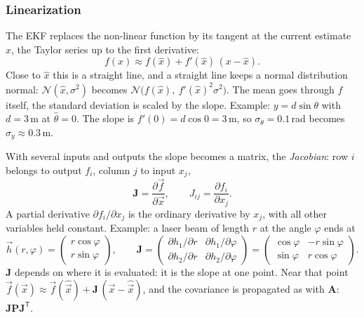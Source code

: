 \documentclass[11pt,a4paper,parskip=half]{scrartcl}
\newcommand{\mat}[1]{\mathbf{#1}}
\newcommand{\T}{^{\mathsf{T}}}
\begin{document}
\subsubsection*{Linearization}
The EKF replaces the non-linear function by its tangent at the current estimate \(\hat x\), the Taylor series up to
the first derivative:
\begin{equation}
  f(x) \approx f(\hat x) + f'(\hat x)\,(x - \hat x) .
  \label{eq:taylor}
\end{equation}
Close to \(\hat x\) this is a straight line, and a straight line keeps a normal distribution normal:
\(\mathcal N(\hat x, \sigma^2)\) becomes \(\mathcal N\big(f(\hat x),\ f'(\hat x)^2 \sigma^2\big)\). The mean goes
through \(f\) itself, the standard deviation is scaled by the slope. Example: \(y = d \sin\theta\) with \(d = 3\)\,m at
\(\hat\theta = 0\). The slope is \(f'(0) = d\cos 0 = 3\)\,m, so \(\sigma_\theta = 0.1\)\,rad becomes
\(\sigma_y \approx 0.3\)\,m.

With several inputs and outputs the slope becomes a matrix, the \emph{Jacobian}: row \(i\) belongs to output
\(f_i\), column \(j\) to input \(x_j\),
\begin{equation}
  \mat J = \frac{\partial \vec f}{\partial \vec x} , \qquad J_{ij} = \frac{\partial f_i}{\partial x_j} .
  \label{eq:jacobian}
\end{equation}
A partial derivative \(\partial f_i / \partial x_j\) is the ordinary derivative by \(x_j\), with all other variables
held constant. Example: a laser beam of length \(r\) at the angle \(\varphi\) ends at
\begin{equation*}
  \vec h(r, \varphi) = \begin{pmatrix} r\cos\varphi \\ r\sin\varphi \end{pmatrix} , \qquad
  \mat J = \begin{pmatrix}
    \partial h_1/\partial r & \partial h_1/\partial\varphi \\
    \partial h_2/\partial r & \partial h_2/\partial\varphi
  \end{pmatrix}
  = \begin{pmatrix} \cos\varphi & -r\sin\varphi \\ \sin\varphi & r\cos\varphi \end{pmatrix} .
\end{equation*}
\(\mat J\) depends on where it is evaluated: it is the slope at one point. Near that point
\(\vec f(\vec x) \approx \vec f(\hat{\vec x}) + \mat J\,(\vec x - \hat{\vec x})\), and the covariance is propagated as
with \(\mat A\): \(\mat J \mat P \mat J\T\).
\end{document}
